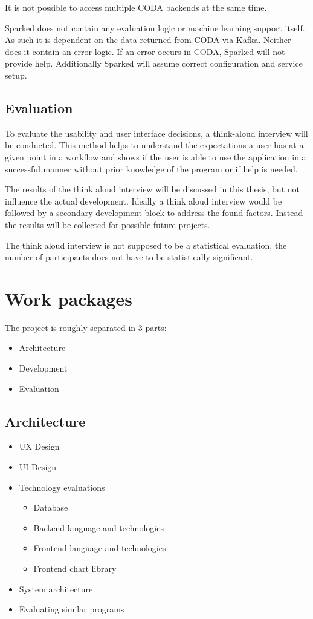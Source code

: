 \documentclass[12pt,a4paper,titlepage,oneside,BCOR1cm]{scrreprt}
\begin{document}
It is not possible to access multiple CODA backends at the same time. 

Sparked does not contain any evaluation logic or machine learning support itself. As such it is dependent on the data returned from CODA via Kafka. Neither does it contain an error logic. If an error occurs in CODA, Sparked will not provide help. Additionally Sparked will assume correct configuration and service setup. 

\section{Evaluation}

To evaluate the usability and user interface decisions, a think-aloud interview will be conducted. This method helps to understand the expectations a user has at a given point in a workflow and shows if the user is able to use the application in a successful manner without prior knowledge of the program or if help is needed.

The results of the think aloud interview will be discussed in this thesis, but not influence the actual development. Ideally a think aloud interview would be followed by a secondary development block to address the found factors. Instead the results will be collected for possible future projects.

The think aloud interview is not supposed to be a statistical evaluation, the number of participants does not have to be statistically significant. 

\chapter{Work packages}

The project is roughly separated in 3 parts:
\begin{itemize}
  \item Architecture
  \item Development
  \item Evaluation
\end{itemize}


\section{Architecture}
\begin{itemize}
  \item UX Design
  \item UI Design
  \item Technology evaluations
  
  \begin{itemize}
    \item Database
    \item Backend language and technologies
    \item Frontend language and technologies
    \item Frontend chart library
  \end{itemize}  
  \item System architecture
  \item Evaluating similar programs

\end{itemize}  
\end{document}
